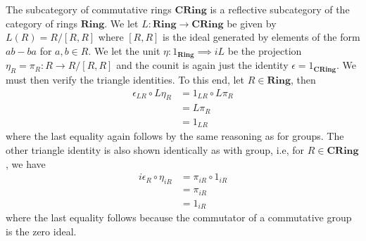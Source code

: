 \begin{example}
  \label{ex:ring}
  The subcategory of commutative rings $ \mathbf{CRing} $ is a reflective subcategory of the category of rings $ \mathbf{Ring} $. We let $ L:\mathbf{Ring} \to \mathbf{CRing} $ be given by $ L(R) = R/[R,R] $ where $ [R,R] $ is the ideal generated by elements of the form $ ab - ba $ for $ a,b \in R $. We let the unit $ \eta: 1_{\mathbf{Ring}} \implies iL $ be the projection $ \eta_R = \pi_R: R \to R/[R,R] $ and the counit is again just the identity $ \epsilon = 1_{\mathbf{CRing}} $. We must then verify the triangle identities. To this end, let $ R \in \mathbf{Ring} $, then
  \begin{align*}
    \epsilon_{LR} \circ L\eta_R &= 1_{LR} \circ L\pi_R \\
                                &= L\pi_R \\
                                &= 1_{LR}
  \end{align*}
  where the last equality again follows by the same reasoning as for groups. The other triangle identity is also shown identically as with group, i.e, for $ R \in \mathbf{CRing} $, we have
  \begin{align*}
    i\epsilon_R \circ \eta_{iR} &= \pi_{iR} \circ 1_{iR} \\
                                &= \pi_{iR} \\
                                &= 1_{iR}
  \end{align*}
  where the last equality follows because the commutator of a commutative group is the zero ideal.
\end{example}

